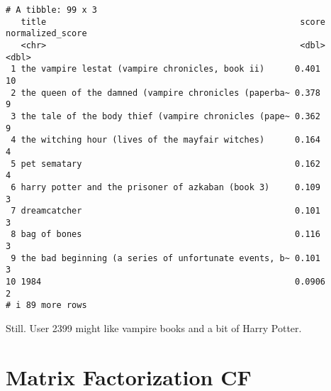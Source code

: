 \documentclass[
]{report}
\begin{document}
\begin{verbatim}
# A tibble: 99 x 3
   title                                                  score normalized_score
   <chr>                                                  <dbl>            <dbl>
 1 the vampire lestat (vampire chronicles, book ii)      0.401                10
 2 the queen of the damned (vampire chronicles (paperba~ 0.378                 9
 3 the tale of the body thief (vampire chronicles (pape~ 0.362                 9
 4 the witching hour (lives of the mayfair witches)      0.164                 4
 5 pet sematary                                          0.162                 4
 6 harry potter and the prisoner of azkaban (book 3)     0.109                 3
 7 dreamcatcher                                          0.101                 3
 8 bag of bones                                          0.116                 3
 9 the bad beginning (a series of unfortunate events, b~ 0.101                 3
10 1984                                                  0.0906                2
# i 89 more rows
\end{verbatim}

Still. User 2399 might like vampire books and a bit of Harry Potter.

\section{Matrix Factorization CF}\label{matrix-factorization-cf}
\end{document}
